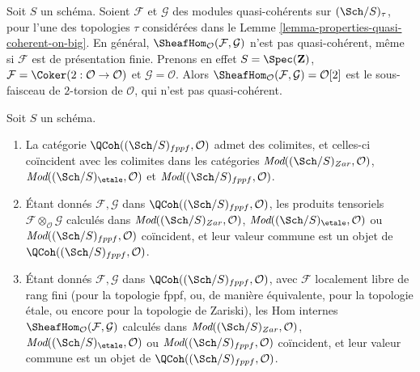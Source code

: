 \begin{example}
\label{example-internal-hom-not-qcoh}
Soit $S$ un schéma. Soient $\mathcal{F}$ et $\mathcal{G}$ des modules
quasi-cohérents sur $(\Sch/S)_\tau$, pour l'une des topologies $\tau$
considérées dans le Lemme \ref{lemma-properties-quasi-coherent-on-big}.
En général, $\SheafHom_\mathcal{O}(\mathcal{F}, \mathcal{G})$ n'est pas
quasi-cohérent, même si $\mathcal{F}$ est de présentation finie.
Prenons en effet $S = \Spec(\mathbf{Z})$,
$\mathcal{F} = \Coker(2 : \mathcal{O} \to \mathcal{O})$ et
$\mathcal{G} = \mathcal{O}$. Alors
$\SheafHom_\mathcal{O}(\mathcal{F}, \mathcal{G}) = \mathcal{O}[2]$
est le sous-faisceau de $2$-torsion de $\mathcal{O}$, qui n'est pas
quasi-cohérent.
\end{example}

\begin{lemma}
\label{lemma-qc-colimits}
Soit $S$ un schéma.
\begin{enumerate}
\item La catégorie $\QCoh((\Sch/S)_{fppf}, \mathcal{O})$ admet des
colimites, et celles-ci coïncident avec les colimites dans les catégories
$\textit{Mod}((\Sch/S)_{Zar}, \mathcal{O})$,
$\textit{Mod}((\Sch/S)_\etale, \mathcal{O})$ et
$\textit{Mod}((\Sch/S)_{fppf}, \mathcal{O})$.
\item Étant donnés $\mathcal{F}, \mathcal{G}$ dans
$\QCoh((\Sch/S)_{fppf}, \mathcal{O})$, les produits tensoriels
$\mathcal{F} \otimes_\mathcal{O} \mathcal{G}$ calculés dans
$\textit{Mod}((\Sch/S)_{Zar}, \mathcal{O})$,
$\textit{Mod}((\Sch/S)_\etale, \mathcal{O})$ ou
$\textit{Mod}((\Sch/S)_{fppf}, \mathcal{O})$ coïncident, et leur valeur
commune est un objet de $\QCoh((\Sch/S)_{fppf}, \mathcal{O})$.
\item Étant donnés $\mathcal{F}, \mathcal{G}$ dans
$\QCoh((\Sch/S)_{fppf}, \mathcal{O})$, avec $\mathcal{F}$ localement libre
de rang fini (pour la topologie fppf, ou, de manière équivalente, pour la
topologie \'etale, ou encore pour la topologie de Zariski), les Hom internes
$\SheafHom_\mathcal{O}(\mathcal{F}, \mathcal{G})$ calculés dans
$\textit{Mod}((\Sch/S)_{Zar}, \mathcal{O})$,
$\textit{Mod}((\Sch/S)_\etale, \mathcal{O})$ ou
$\textit{Mod}((\Sch/S)_{fppf}, \mathcal{O})$ coïncident, et leur valeur
commune est un objet de $\QCoh((\Sch/S)_{fppf}, \mathcal{O})$.
\end{enumerate}
\end{lemma}


